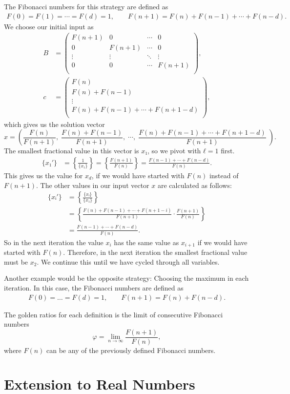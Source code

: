 The Fibonacci numbers for this strategy are defined as
\begin{align*}
  F(0) = F(1) = ⋯ = F(d) = 1, \qquad F(n + 1) = F(n) + F(n - 1) + ⋯ + F(n - d).
\end{align*}
We choose our initial input as
\begin{align*}
  B & =
  \begin{pmatrix}
    F(n + 1) & 0        & ⋯ & 0 \\
    0        & F(n + 1) & ⋯ & 0 \\
    ⋮        & ⋮        & ⋱ & ⋮ \\
    0 & 0 & ⋯ & F(n + 1) \\
  \end{pmatrix}, \\
  c & =
  \begin{pmatrix}
    F(n) \\
    F(n) + F(n - 1) \\
    ⋮ \\
    F(n) + F(n - 1) + ⋯ + F(n + 1 - d) \\
  \end{pmatrix},
\end{align*}
which gives us the solution vector
\[
  x =
  \left(
    \frac{F(n)}{F(n + 1)},\;
    \frac{F(n) + F(n - 1)}{F(n + 1)},\;
    ⋯,\;
    \frac{F(n) + F(n - 1) + ⋯ + F(n + 1 - d)}{F(n + 1)}\;
  \right).
\]
The smallest fractional value in this vector is $x₁$, so we pivot with $ℓ = 1$ first.
\begin{align*}
  \{x₁'\}
  & = \left\{\frac{1}{\{x₁\}}\right\}
  = \left\{\frac{F(n + 1)}{F(n)}\right\}
  = \frac{F(n - 1) + ⋯ + F(n - d)}{F(n)}.
\end{align*}
This gives us the value for $x_d$, if we would have started with $F(n)$ instead of $F(n+1)$.
The other values in our input vector $x$ are calculated as follows:
\begin{align*}
  \{xᵢ'\}
  & = \left\{\frac{\{xᵢ\}}{\{x₁\}}\right\} \\
  & = \left\{\frac{F(n) + F(n - 1) + ⋯ + F(n + 1 - i)}{F(n + 1)} · \frac{F(n + 1)}{F(n)}\right\} \\
  & = \frac{F(n - 1) + ⋯ + F(n - d)}{F(n)}.
\end{align*}
So in the next iteration the value $x_i$ has the same value as $x_{i+1}$ if we
would have started with $F(n)$.
Therefore, in the next iteration the smallest fractional value must be $x_2$.
We continue this until we have cycled through all variables.

Another example would be the opposite strategy: Choosing the maximum in each iteration.
In this case, the Fibonacci numbers are defined as
\begin{align*}
  F(0) = \dots = F(d) = 1, \qquad F(n + 1) = F(n) + F(n - d).
\end{align*}

The golden ratios for each definition is the limit of consecutive Fibonacci numbers
\[
  φ = \lim_{n → ∞} \frac{F(n + 1)}{F(n)},
\]
where $F(n)$ can be any of the previously defined Fibonacci numbers.

\section{Extension to Real Numbers}
